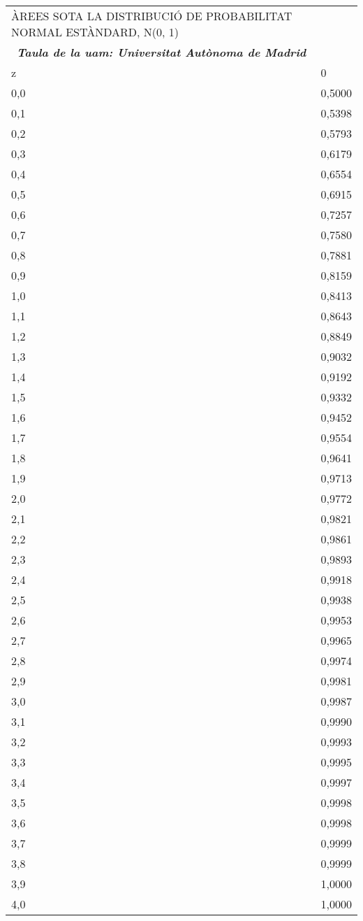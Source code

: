 \begin{longtable}[]{@{}ll@{}}
\toprule
ÀREES SOTA LA DISTRIBUCIÓ DE PROBABILITAT NORMAL ESTÀNDARD, N(0, 1)
&\tabularnewline
~\emph{\textbf{\emph{\textbf{Taula de la uam: Universitat Autònoma de
Madrid}}}} &\tabularnewline
z & 0\tabularnewline
0,0 & 0,5000\tabularnewline
0,1 & 0,5398\tabularnewline
0,2 & 0,5793\tabularnewline
0,3 & 0,6179\tabularnewline
0,4 & 0,6554\tabularnewline
0,5 & 0,6915\tabularnewline
0,6 & 0,7257\tabularnewline
0,7 & 0,7580\tabularnewline
0,8 & 0,7881\tabularnewline
0,9 & 0,8159\tabularnewline
1,0 & 0,8413\tabularnewline
1,1 & 0,8643\tabularnewline
1,2 & 0,8849\tabularnewline
1,3 & 0,9032\tabularnewline
1,4 & 0,9192\tabularnewline
1,5 & 0,9332\tabularnewline
1,6 & 0,9452\tabularnewline
1,7 & 0,9554\tabularnewline
1,8 & 0,9641\tabularnewline
1,9 & 0,9713\tabularnewline
2,0 & 0,9772\tabularnewline
2,1 & 0,9821\tabularnewline
2,2 & 0,9861\tabularnewline
2,3 & 0,9893\tabularnewline
2,4 & 0,9918\tabularnewline
2,5 & 0,9938\tabularnewline
2,6 & 0,9953\tabularnewline
2,7 & 0,9965\tabularnewline
2,8 & 0,9974\tabularnewline
2,9 & 0,9981\tabularnewline
3,0 & 0,9987\tabularnewline
3,1 & 0,9990\tabularnewline
3,2 & 0,9993\tabularnewline
3,3 & 0,9995\tabularnewline
3,4 & 0,9997\tabularnewline
3,5 & 0,9998\tabularnewline
3,6 & 0,9998\tabularnewline
3,7 & 0,9999\tabularnewline
3,8 & 0,9999\tabularnewline
3,9 & 1,0000\tabularnewline
4,0 & 1,0000\tabularnewline
\bottomrule
\end{longtable}
